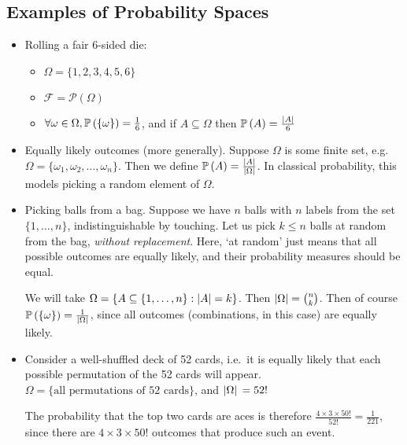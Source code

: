 \subsection{Examples of Probability Spaces}
\begin{itemize}
	\item Rolling a fair 6-sided die:
	      \begin{itemize}
		      \item \(\Omega = \{ 1, 2, 3, 4, 5, 6 \}\)
		      \item \(\mathcal F = \mathcal P(\Omega)\)
		      \item \(\forall \omega \in \Omega, \mathbb{P}\left({\{ \omega \}}\right) = \frac{1}{6}\), and if \(A \subseteq \Omega\) then \(\mathbb{P}\left({A}\right) = \frac{\abs{A}}{6}\)
	      \end{itemize}
	      
	\item Equally likely outcomes (more generally).
	      Suppose \(\Omega\) is some finite set, e.g.
	      \(\Omega = \{ \omega_1, \omega_2, \dots, \omega_n \}\).
	      Then we define \(\mathbb{P}\left({A}\right) = \frac{\abs{A}}{\abs{\Omega}}\).
	      In classical probability, this models picking a random element of \(\Omega\).
	      
	\item Picking balls from a bag.
	      Suppose we have \(n\) balls with \(n\) labels from the set \(\{1, \dots, n\}\), indistinguishable by touching.
	      Let us pick \(k \leq n\) balls at random from the bag, \textit{without replacement}.
	      Here, `at random' just means that all possible outcomes are equally likely, and their probability measures should be equal.
	      
	      We will take \(\Omega = \{ A \subseteq \{1, \dots, n\} : \abs{A} = k \}\).
	      Then \(\abs{\Omega} = \binom{n}{k}\).
	      Then of course \(\mathbb{P}\left({\{ \omega \}}\right) = \frac{1}{\abs*{\Omega}}\), since all outcomes (combinations, in this case) are equally likely.
	      
	\item Consider a well-shuffled deck of 52 cards, i.e.\ it is equally likely that each possible permutation of the 52 cards will appear.
	      \(\Omega = \{ \text{all permutations of 52 cards} \}\), and \(\abs*{\Omega} = 52! \)
	      
	      The probability that the top two cards are aces is therefore \(\frac{4 \times 3 \times 50!}{52!} = \frac{1}{221}\), since there are \(4 \times 3 \times 50! \) outcomes that produce such an event.
	      

\end{itemize}
